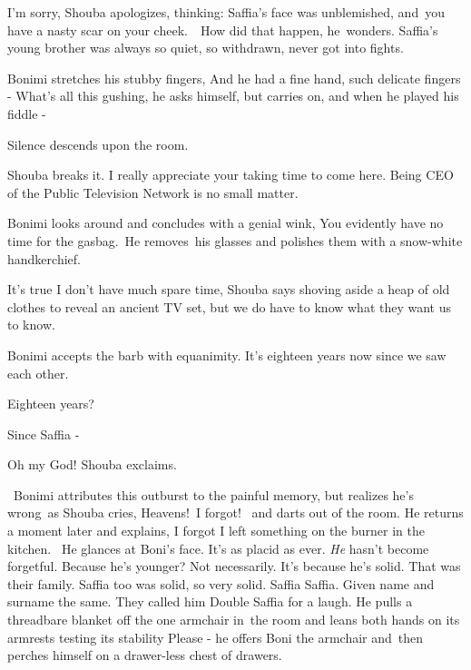 \documentclass[twoside,11pt]{book}
\begin{document}
{\textquotedbl}I'm sorry,{\textquotedbl} Shouba apologizes, thinking: Saffia's face was unblemished,
and{\ }you have a nasty scar on your cheek.\ \ How did that happen,
he\ wonders. Saffia's young brother was always so quiet, so withdrawn, never got into fights.

Bonimi stretches his stubby fingers, {\textquotedbl}And he had a fine hand, such delicate fingers -{\textquotedbl}
What's all this gushing, he asks himself, but carries on, {\textquotedbl}and when he played his fiddle -{\textquotedbl}

Silence descends upon the room.

Shouba breaks it. {\textquotedbl}I really appreciate your taking time to come here. Being CEO of the Public Television
Network is no small matter.{\textquotedbl}

Bonimi looks around and concludes with a genial wink, {\textquotedbl}You evidently have no time for the
gasbag.{\textquotedbl}\ He removes~his glasses and polishes them with a snow{}-white handkerchief. 

{\textquotedbl}It's true I don't have much spare time,{\textquotedbl} Shouba says shoving aside a heap of old clothes to
reveal an ancient TV set, {\textquotedbl}but we do have to know what they want us to know.{\textquotedbl}

Bonimi accepts the barb with equanimity. {\textquotedbl}It's eighteen years now since we saw each other.{\textquotedbl} 

{\textquotedbl}Eighteen years?{\textquotedbl}

{\textquotedbl}Since Saffia -{\textquotedbl} 

{\textquotedbl}Oh my God!{\textquotedbl} Shouba exclaims.

~Bonimi attributes this outburst to the painful memory, but realizes he's wrong~as Shouba cries,
{\textquotedbl}Heavens!{\ }I forgot!{\textquotedbl}
{\ }and darts out of the room. He returns a moment later and explains,
{\textquotedbl}I forgot I left something on the burner in the kitchen.{\textquotedbl}~ He glances at Boni's face. It's
as placid as ever. \textit{He} hasn't become forgetful. Because he's younger? Not necessarily. It's because he's solid.
That was their family. Saffia too was solid, so very solid. Saffia Saffia. Given name and surname the same. They called
him {\textquotedbl}Double Saffia{\textquotedbl} for a laugh. He pulls a threadbare blanket off the one armchair in~the
room and leans both hands on its armrests testing its stability {\textquotedbl}Please -{\textquotedbl} he offers Boni
the armchair and\ then perches himself on a drawer-less chest of drawers. 
\end{document}
